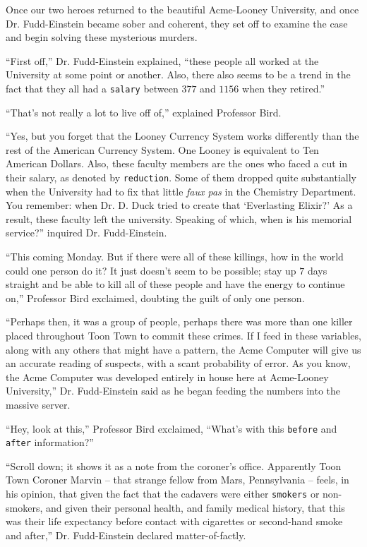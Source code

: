 \documentclass[captions=tableheading]{scrbook}
\begin{document}
\begin{example}
Once our two heroes returned to the beautiful Acme-Looney University, and once Dr. Fudd-Einstein became sober and coherent, they set off to examine the case and begin solving these mysterious murders.

“First off,” Dr. Fudd-Einstein explained, “these people all worked at the University at some point or another. Also, there also seems to be a trend in the fact that they all had a \texttt{salary} between \(  377 \) and \(  1156 \) when they retired.” 

“That’s not really a lot to live off of,” explained Professor Bird. 

“Yes, but you forget that the Looney Currency System works differently than the rest of the American Currency System. One Looney is equivalent to Ten American Dollars. Also, these faculty members are the ones who faced a cut in their salary, as denoted by \texttt{reduction}. Some of them dropped quite substantially when the University had to fix that little \emph{faux pas} in the Chemistry Department. You remember: when Dr. D. Duck tried to create that ‘Everlasting Elixir?’ As a result, these faculty left the university. Speaking of which, when is his memorial service?” inquired Dr. Fudd-Einstein. 

“This coming Monday. But if there were all of these killings, how in the world could one person do it? It just doesn’t seem to be possible; stay up \(  7 \) days straight and be able to kill all of these people and have the energy to continue on,” Professor Bird exclaimed, doubting the guilt of only one person. 

“Perhaps then, it was a group of people, perhaps there was more than one killer placed throughout Toon Town to commit these crimes. If I feed in these variables, along with any others that might have a pattern, the Acme Computer will give us an accurate reading of suspects, with a scant probability of error. As you know, the Acme Computer was developed entirely in house here at Acme-Looney University,” Dr. Fudd-Einstein said as he began feeding the numbers into the massive server. 

“Hey, look at this,” Professor Bird exclaimed, “What’s with this \texttt{before} and \texttt{after} information?” 

“Scroll down; it shows it as a note from the coroner’s office. Apparently Toon Town Coroner Marvin -- that strange fellow from Mars, Pennsylvania -- feels, in his opinion, that given the fact that the cadavers were either \texttt{smokers} or non-smokers, and given their personal health, and family medical history, that this was their life expectancy before contact with cigarettes or second-hand smoke and after,” Dr. Fudd-Einstein declared matter-of-factly. 


\end{example}
\end{document}
